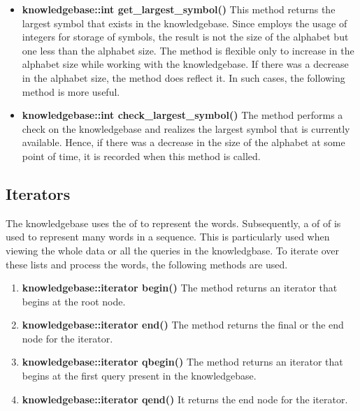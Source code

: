 \begin{itemize}
\item \textbf{knowledgebase::int get\_largest\_symbol()} \vskip 1pt 
This method returns the largest symbol that exists in the knowledgebase. Since \libalf employs the usage of integers for storage of symbols, the result is not the size of the alphabet but one less than the alphabet size. The method is flexible only to increase in the alphabet size while working with the knowledgebase. If there was a decrease in the alphabet size, the method does reflect it. In such cases, the following method is more useful.

\item \textbf{knowledgebase::int check\_largest\_symbol()} \hfill \vskip 1pt
The method performs a check on the knowledgebase and realizes the largest symbol that is currently available. Hence, if there was a decrease in the size of the alphabet at some point of time, it is recorded when this method is called.
\end{itemize}	

\subsection*{Iterators}

The knowledgebase uses the \lists of \integer to represent the words. Subsequently, a \lists of \lists of \integer is used to represent many words in a sequence. This is particularly used when viewing the whole data or all the queries in the knowledgbase. To iterate over these lists and process the words, the following methods are used. 

\begin{enumerate}
\item \textbf{knowledgebase::iterator begin()} \vskip 1pt
	The method returns an iterator that begins at the root node.

\item \textbf{knowledgebase::iterator end()} \vskip 1pt
	The method returns the final or the end node for the iterator.
	 
\item \textbf{knowledgebase::iterator qbegin()} \vskip 1pt
	The method returns an iterator that begins at the first query present in the knowledgebase.
	
\item \textbf{knowledgebase::iterator qend()} \vskip 1pt
	It returns the end node for the iterator.
\end{enumerate}

